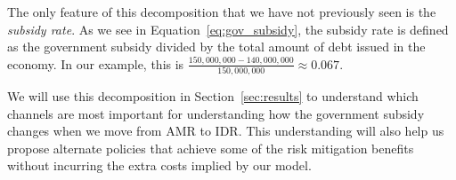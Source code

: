   The only feature of this decomposition that we have not previously seen is the \textit{subsidy
  rate}. As we see in Equation~\ref{eq:gov_subsidy}, the subsidy rate is defined as the government
  subsidy divided by the total amount of debt issued in the economy. In our example, this is
  $\frac{150,000,000 - 140,000,000}{150,000,000} \approx 0.067$.

  We will use this decomposition in Section~\ref{sec:results} to understand which channels are most
  important for understanding how the government subsidy changes when we move from AMR to IDR. This
  understanding will also help us propose alternate policies that achieve some of the risk
  mitigation benefits without incurring the extra costs implied by our model.
